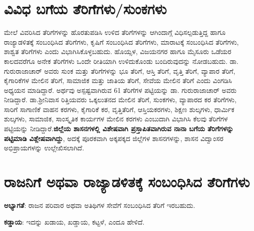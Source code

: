 \newpage

\section{ವಿವಿಧ ಬಗೆಯ ತೆರಿಗೆಗಳು/ಸುಂಕಗಳು}

ಮೇಲೆ ವಿವರಿಸಿದ ತೆರಿಗೆಗಳನ್ನು ಹೊರತುಪಡಿಸಿ ಉಳಿದ ತೆರಿಗೆಗಳನ್ನು ಆಗಿಂದಾಗ್ಗೆ ವಿಧಿಸಲ್ಪಡುತ್ತಿದ್ದ ಹಾಗೂ ರಾಜ್ಯಾಡಳಿತಕ್ಕೆ ಸಂಬಂಧಿಸಿದ ತೆರಿಗೆಗಳು, ಕೃಷಿಗೆ ಸಂಬಂಧಿಸಿದ ತೆರಿಗೆಗಳು, ಮಾರಾಟಕ್ಕೆ ಸಂಬಂಧಿಸಿದ ತೆರಿಗೆಗಳು, ಶಾಶ್ವತ ತೆರಿಗೆಗಳು ಎಂದು ವಿಭಾಗಿಸಿಕೊಳ್ಳಬಹುದು. ಹೊಯ್ಸಳ, ವಿಜಯನಗರ ಹಾಗೂ ಮೈಸೂರು ಒಡೆಯರ ಕಾಲದವರೆಗೂ ಅನೇಕ ತೆರಿಗೆಗಳು ಒಂದೇ ರೀತಿಯಾಗಿ ಉಳಿದುಕೊಂಡು ಬಂದಿರುವುದನ್ನು ನೋಡಬಹುದು. ಡಾ. ಗುರುರಾಜಾಚಾರ್​ ಅವರು ಸುಂಕ ಮತ್ತು ತೆರಿಗೆಗಳನ್ನು ಭೂ ತೆರಿಗೆ, ಆಸ್ತಿ ತೆರಿಗೆ, ವೃತ್ತಿ ತೆರಿಗೆ, ವ್ಯಾಪಾರ ತೆರಿಗೆ, ಕೈಗಾರಿಕೆಗಳ ಮೇಲಿನ ತೆರಿಗೆ, ಸಾಮಾಜಿಕ ಮತ್ತು ಜಾತಿಯ ತೆರಿಗೆ, ಸೇವೆಯ ಮೇಲಿನ ತೆರಿಗೆ ಎಂದು ವಿಂಗಡಿಸಿ ಅಧ್ಯಯನ ಮಾಡಿದ್ದಾರೆ. ಅರ್ಥವು ಅಸ್ಪಷ್ಟವಾಗಿರುವ 61 ತೆರಿಗೆಗಳ ಪಟ್ಟಿಯನ್ನು ಡಾ. ಗುರುರಾಜಾಚಾರ್ ಅವರು ನೀಡಿದ್ದಾರೆ. ಡಾ.ಶ‍್ರೀನಿವಾಸ ರಿತ್ತಿಯವರು ಒಕ್ಕಲುತನದ ಮೇಲಿನ ತೆರಿಗೆ, ಸುಂಕಗಳು, ವ್ಯಾಪಾರದ ಕರ ತೆರಿಗೆಗಳು, ಸಾರಿಗೆ ಸಾಗಾಣಿಕೆ ವಾಹನ ಕರಗಳು, ಕೈಗಾರಿಕೆ ಕರ, ವೃತ್ತಿತೆರಿಗೆ, ಆಸ್ತಿಯಕರಗಳು, ಶಿಕ್ಷಣ ಶುಲ್ಕಗಳು, ಧಾರ್ಮಿಕ ಶುಲ್ಕಗಳು, ಸಾಮಾಜಿಕ, ಸಾಂಸ್ಕೃತಿಕ ಕಾರ್ಯಗಳ ಮೇಲಿನ ಕರಗಳು ಎಂಬುದಾಗಿ ವಿಭಾಗಿಸಿ ಕೆಲವು ತೆರಿಗೆಗಳ ಪಟ್ಟಿಯನ್ನು ನೀಡಿದ್ದಾರೆ.\textbf{ಜಿಲ್ಲೆಯ ಶಾಸನಗಳಲ್ಲಿ ವಿಶೇಷವಾಗಿ ಪ್ರಸ್ತಾಪಿತವಾಗಿರುವ ನಾನಾ ಬಗೆಯ ತೆರಿಗೆಗಳನ್ನು ಪಟ್ಟಿಮಾಡಿ ವಿಶ್ಲೇಷವಾಗಿದ್ದು}, ಅದಕ್ಕೆ ಪೂರಕವಾಗಿ ಅಕ್ಕಪಕ್ಕದ ಜಿಲ್ಲೆಗಳ ಶಾಸನಗಳನ್ನು, ಶಾಸನ ವಿದ್ವಾಂಸರ ಅಭಿಪ್ರಾಯಗಳನ್ನು ಉಲ್ಲೇಖಿಸಲಾಗಿದೆ.

\vskip 5pt

\section{ರಾಜನಿಗೆ ಅಥವಾ ರಾಜ್ಯಾಡಳಿತಕ್ಕೆ ಸಂಬಂಧಿಸಿದ ತೆರಿಗೆಗಳು}

\textbf{ಅಭ್ಯಾಗತೆ}: ರಾಜನ ಪರಿವಾರ ಅಥವಾ ಅತಿಥಿಗಳ ಸೇವೆಗೆ ಸಂಬಂಧಿಸಿದ ತೆರಿಗೆ ಇರಬಹುದು.

\vskip 3pt

\textbf{ಕಡ್ಡಾಯ}: ಇದನ್ನು ಖಡಾಯ, ಖಡ್ಡಾಯ, ಕಟ್ಟಳೆ, ಎಂದೂ ಹೇಳಿದೆ.

\vskip 3pt

